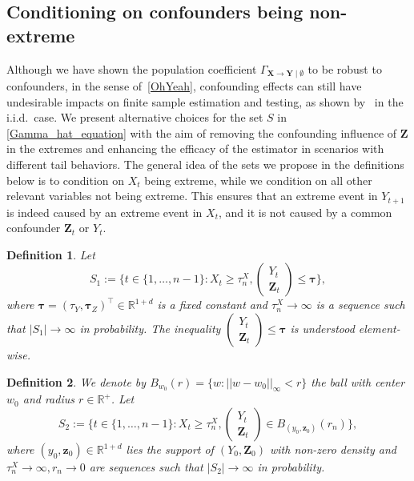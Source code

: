\documentclass[a4paper,11pt]{article}
\newtheorem{definition}{Definition}
\begin{document}
\subsection{Conditioning on confounders being non-extreme}
Although we have shown the population coefficient $\Gamma_{\textbf{X}\to\textbf{Y}\mid\emptyset}$ to be robust to confounders, in the sense of~\eqref{OhYeah}, confounding effects can still have undesirable impacts on finite sample estimation and testing, as shown by~\cite{Pasche} in the i.i.d.\ case. 
We present alternative choices for the set $S$ in \eqref{Gamma_hat_equation} with the aim of removing the confounding influence of $\textbf{Z}$ in the extremes and enhancing the efficacy of the estimator in scenarios with different tail behaviors.
The general idea of the sets we propose in the definitions below is to condition on  $X_t$ being extreme, while we condition on all other relevant variables not being extreme. 
This ensures that an extreme event in $Y_{t+1}$ is indeed caused by an extreme event in $X_{t}$, and it is not caused by a common confounder $\textbf{Z}_{t}$ or $Y_{t}$. 
\begin{definition}\label{Def_estim_S1}
  Let \begin{equation*}
      S_{1} := \{t\in\{1, \dots, n-1\}: X_t\geq \tau_n^X, 
      \begin{pmatrix}
    Y_t \\
    \textbf{Z}_t 
\end{pmatrix}   \leq  \boldsymbol{\tau} \},
  \end{equation*}
where $\boldsymbol{\tau} = (\tau_Y, \boldsymbol{\tau}_Z)^{\top}\in\mathbb{R}^{1+d}$ is a fixed constant and $\tau_n^X\to\infty$ is a sequence such that $|S_1|\to\infty$ in probability. The inequality $ \begin{pmatrix} Y_t \\ \textbf{Z}_t \end{pmatrix} \leq \boldsymbol{\tau} $ is understood element-wise.
\end{definition}
\begin{definition}\label{definition_of_S2}
  We denote by $B_{w_0}(r) = \{w : ||w-w_0||_{\infty}<r\}$ the ball with center $w_0$ and radius $r\in\mathbb{R}^+$. 
  Let \begin{equation*}
      S_2 := \{t\in\{1, \dots, n-1\}: X_t\geq \tau_n^X, 
      \begin{pmatrix}
    Y_t \\
    \textbf{Z}_t 
\end{pmatrix}   \in {B}_{(y_0, \textbf{z}_0)}(r_n) \},
  \end{equation*}
where $(y_0, \textbf{z}_0)\in\mathbb{R}^{1+d}$ lies the support of $(Y_0, \textbf{Z}_0)$ with non-zero density and $\tau_n^X\to\infty, r_n\to 0$ are sequences such that $|S_2|\to\infty$ in probability.
\end{definition}
\end{document}
